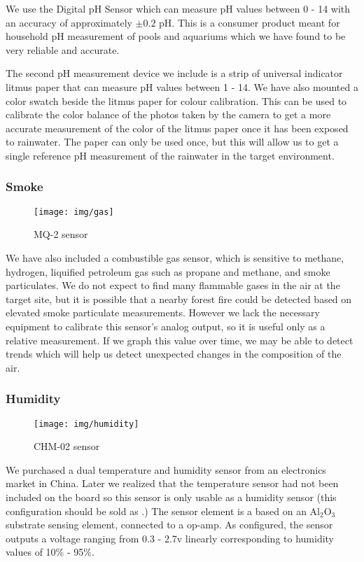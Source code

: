 We use the  Digital pH Sensor which can measure pH values between 0 - 14 with an accuracy of approximately $\pm0.2$ pH. This is a consumer product meant for household pH measurement of pools and aquariums which we have found to be very reliable and accurate.

The second pH measurement device we include is a strip of universal indicator litmus paper that can measure pH values between 1 - 14. We have also mounted a color swatch beside the litmus paper for colour calibration. This can be used to calibrate the color balance of the photos taken by the camera to get a more accurate measurement of the color of the litmus paper once it has been exposed to rainwater. The paper can only be used once, but this will allow us to get a single reference pH measurement of the rainwater in the target environment. 

    \subsubsection*{Smoke}
    \begin{wrapfigure}{l}{0.17\textwidth}
        \centering
        \texttt{[image: img/gas]}
        \caption*{MQ-2 sensor}
    \end{wrapfigure}
    We have also included a  combustible gas sensor, which is sensitive to methane, hydrogen, liquified petroleum gas such as propane and methane, and smoke particulates. We do not expect to find many flammable gases in the air at the target site, but it is possible that a nearby forest fire could be detected based on elevated smoke particulate measurements. However we lack the necessary equipment to calibrate this sensor's analog output, so it is useful only as a relative measurement. If we graph this value over time, we may be able to detect trends which will help us detect unexpected changes in the composition of the air.

    \subsubsection*{Humidity}
    \begin{wrapfigure}{l}{0.16\textwidth}
        \centering
        \texttt{[image: img/humidity]}
        \caption*{CHM-02 sensor}
    \end{wrapfigure}
    We purchased a  dual temperature and humidity sensor from an electronics market in China. Later we realized that the  temperature sensor had not been included on the board so this sensor is only usable as a humidity sensor (this configuration should be sold as .) The sensor element is a  based on an Al$_2$O$_3$ substrate sensing element, connected to a  op-amp. As configured, the sensor outputs a voltage ranging from 0.3 - 2.7v linearly corresponding to humidity values of 10\% - 95\%. 

